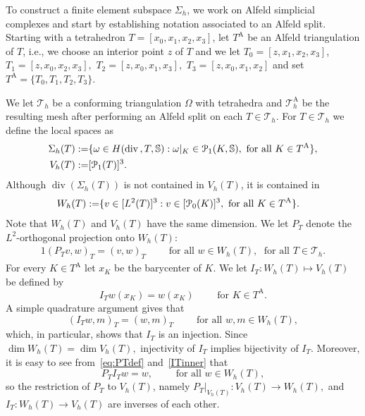 \documentclass[12pt]{amsart}
\numberwithin{equation}{section}
\DeclareMathOperator{\divg}{div}
\theoremstyle{definition}
\theoremstyle{remark}
\renewcommand{\(}{\bigl(}
\renewcommand{\)}{\bigr)}
\newcommand{\dive}{{\ensuremath\mathop{\mathrm{div}\,}}} %
\newcommand{\pol}{\EuScript{P}}
\newcommand{\Ta}{T^{\text{A}}}
\newcommand{\Tha}{\mathcal{T}_h^{\text{A}}}
\newcommand{\Th}{\mathcal{T}_h}
\begin{document}
To construct a finite element subspace $\Sigma_h$, 
we  work on Alfeld simplicial complexes and start by establishing notation associated to an Alfeld split.
Starting with a tetrahedron $T=[x_0, x_1, x_2,  x_3]$,
let $\Ta$ be an Alfeld triangulation of $T$, i.e.,
we choose an interior point $z$ of $T$ and
we let $T_0=[z, x_1, x_2, x_3]$,  $T_1=[z, x_0, x_2, x_3],$
$T_2=[z, x_0, x_1, x_3],$
$T_3=[z, x_0, x_1, x_2]$
and set $\Ta= \{ T_0, T_1, T_2, T_3\} $.  


We let $\Th$ be a conforming triangulation $\Omega$ with tetrahedra and $\Tha$ be the resulting mesh after performing an Alfeld split on each $T \in \Th$. 
For $T \in \Th$ we define the  local spaces as 
\begin{alignat*}{1}
    \Sigma_h(T):=&\{ \omega \in H(\dive, T, \mathbb{S}): \omega|_K \in \pol_1(K, \mathbb{S}), \text{ for all }  K \in \Ta\}, \\
    V_h(T):=&  [\pol_1(T)]^3.
\end{alignat*}
Although  $\divg( \Sigma_h(T))$ is not contained  in $V_h(T)$,
it is contained in 
\begin{alignat*}{1}
W_h(T):=&\{ v \in [L^2(T)]^3: v \in [\pol_0(K)]^3, \text{ for all }  K \in \Ta\}.
\end{alignat*}
Note that $W_h(T)$ and  $V_h(T)$ have the same dimension.  We let 
 $P_T$ denote the $L^2$-orthogonal projection onto $W_h(T)$:
 \begin{alignat}{1}
   \label{eq:PTdef}
  (P_T v, w)_T=(v, w)_T \qquad {\text{ for all }} w \in W_h(T), \; {\text{ for all }} 
  T \in \Th.
\end{alignat}
For every $K \in \Ta$ let $x_K$ be the barycenter of $K$. We let $I_T: W_h(T) \mapsto V_h(T)$ be  defined by  
\begin{equation}\label{IT}
I_T w(x_K)= w(x_K) \qquad \text{ for } K \in \Ta.
\end{equation}
A simple quadrature argument gives that
\begin{equation}\label{ITinner}
(I_T w, m)_T=(w, m)_T \qquad {\text{ for all }}  w,m \in W_h(T),
\end{equation}
which, in particular, shows that $I_T$ is an injection.  
Since $\dim W_h(T) = \dim V_h(T),$
injectivity of $I_T$  implies bijectivity of  $I_T$. 
Moreover, it is easy to see from~\eqref{eq:PTdef} and~\eqref{ITinner} that
\begin{equation}
  \label{eq:PhIh}
  P_T I_T w = w, \qquad \text{ for all } w \in W_h(T),
\end{equation}
so the restriction of $P_T$ to $V_h(T)$, namely $P_T|_{V_h(T)}: V_h(T) \to W_h(T),$ and  $I_T: W_h(T) \to V_h(T)$  are inverses of each other.
\end{document}

